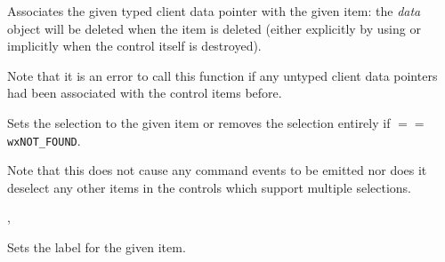 



\label{wxcontrolwithitemssetclientobject}


Associates the given typed client data pointer with the given item: the
{\it data} object will be deleted when the item is deleted (either explicitly
by using  or implicitly when the
control itself is destroyed).

Note that it is an error to call this function if any untyped client data
pointers had been associated with the control items before.





\label{wxcontrolwithitemssetselection}


Sets the selection to the given item  or removes the selection entirely
if  $==$ {\tt wxNOT\_FOUND}.

Note that this does not cause any command events to be emitted nor does it
deselect any other items in the controls which support multiple selections.




,\rtfsp
{}


\label{wxcontrolwithitemssetstring}


Sets the label for the given item.



